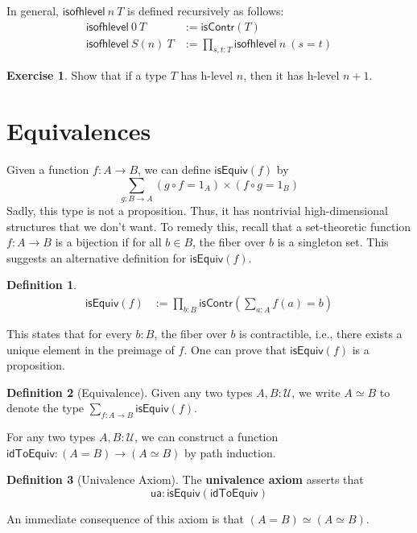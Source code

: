 \documentclass{amsart}
\theoremstyle{definition}
\newtheorem{ex}{Exercise}[section]
\newtheorem{defn}{Definition}[section]
\newcommand{\isContr}{\ensuremath{\mathsf{isContr}}}
\newcommand{\isofhlevel}[2]{\ensuremath{\mathsf{isofhlevel}~#1~#2}}
\newcommand{\isEquiv}{\ensuremath{\mathsf{isEquiv}}}
\newcommand{\idToEquiv}{\ensuremath{\mathsf{idToEquiv}}}
\newcommand{\U}{\ensuremath{\mathcal{U}}}
\newcommand{\ua}{\ensuremath{\mathsf{ua}}}
\renewcommand{\emph}{\textbf}
\begin{document}
In general, $\isofhlevel{n}{T}$ is defined recursively as follows:
\begin{align*}
    \isofhlevel{0}{T} &:= \isContr(T)\\
    \isofhlevel{S(n)}{T} &:= \prod_{s,t : T}\isofhlevel{n}{(s = t)}
\end{align*}

\begin{ex}
Show that if a type $T$ has h-level $n$, then it has h-level $n + 1$.
\end{ex}

\section{Equivalences}
Given a function $f : A \to B$, we can define $\isEquiv(f)$ by
\[
    \sum_{g : B \to A} (g \circ f = 1_{A}) \times (f \circ g = 1_{B})
\]
Sadly, this type is not a proposition.
Thus, it has nontrivial high-dimensional structures that we don't want.
To remedy this, recall that a set-theoretic function $f : A \to B$ is a bijection if for all $b \in B$, the fiber over $b$ is a singleton set.
This suggests an alternative definition for $\isEquiv(f)$.
\begin{defn}
\begin{align*}
    \isEquiv(f) &:= \prod_{b : B} \isContr\left(\sum_{a : A} f(a)=b\right)
\end{align*}
\end{defn}
This states that for every $b : B$, the fiber over $b$ is contractible, i.e., there exists a unique element in the preimage of $f$.
One can prove that $\isEquiv(f)$ is a proposition.

\begin{defn}[Equivalence]
    Given any two types $A, B : \U$, we write $A \simeq B$ to denote the type $\displaystyle\sum_{f : A \to B} \isEquiv(f)$.
\end{defn}
For any two types $A, B : \U$, we can construct a function $\idToEquiv : (A = B) \to (A \simeq B)$ by path induction.
\begin{defn}[Univalence Axiom]
    The \emph{univalence axiom} asserts that 
    \[\ua : \isEquiv(\idToEquiv)\]
\end{defn}
An immediate consequence of this axiom is that $(A = B) \simeq (A \simeq B)$.
\end{document}
